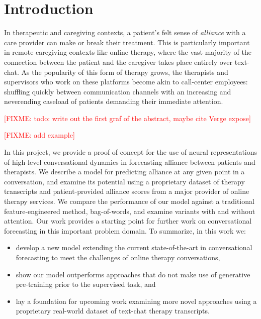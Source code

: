\documentclass{article}
\newcommand{\fixme}[1]{\textcolor{red}{[FIXME: #1]}}
\begin{document}
\section{Introduction}
\label{sec:introduction}


In therapeutic and caregiving contexts, a patient’s felt sense of \textit{alliance} with a care provider can make or break their treatment. This is particularly important in remote caregiving contexts like online therapy, where the vast majority of the connection between the patient and the caregiver takes place entirely over text-chat. As the popularity of this form of therapy grows, the therapists and supervisors who work on these platforms become akin to call-center employees: shuffling quickly between communication channels with an increasing and neverending caseload of patients demanding their immediate attention.

\fixme{todo: write out the first graf of the abstract, maybe cite Verge expose}

\fixme{add example}


In this project, we provide a proof of concept for the use of neural representations of high-level conversational dynamics in forecasting alliance between patients and therapists. We describe a model for predicting alliance at any given point in a conversation, and examine its potential using a proprietary dataset of therapy transcripts and patient-provided alliance scores from a major provider of online therapy services. We compare the performance of our model against a traditional feature-engineered method, bag-of-words, and examine variants with and without attention. Our work provides a starting point for further work on conversational forecasting in this important problem domain. To summarize, in this work we:

\begin{itemize}
  \item develop a new model extending the current state-of-the-art in conversational forecasting to meet the challenges of online therapy conversations,
  \item show our model outperforms approaches that do not make use of generative pre-training prior to the supervised task, and
  \item lay a foundation for upcoming work examining more novel approaches using a proprietary real-world dataset of text-chat therapy transcripts.
\end{itemize}
\end{document}
